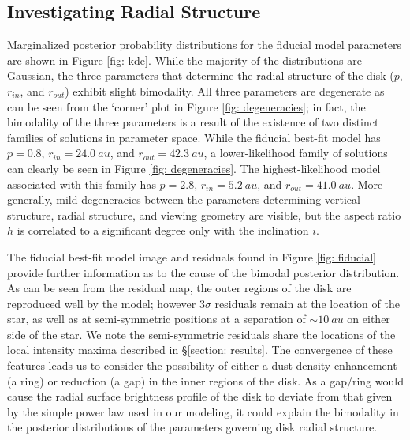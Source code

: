 \documentclass[modern]{aastex62}
\begin{document}
\subsection{Investigating Radial Structure}
\label{subsection: radial analysis}

Marginalized posterior probability distributions for the fiducial model parameters are shown in Figure \ref{fig: kde}.
While the majority of the distributions are Gaussian, the three parameters that determine the radial structure of the disk ($p$, $r_{in}$, and $r_{out}$) exhibit slight bimodality. 
All three parameters are degenerate as can be seen from the `corner' plot in Figure \ref{fig: degeneracies}; in fact, the bimodality of the three parameters is a result of the existence of two distinct families of solutions in parameter space.
While the fiducial best-fit model has $p=0.8$, $r_{in}=\SI{24.0}{au}$, and $r_{out}=\SI{42.3}{au}$, a lower-likelihood family of solutions can clearly be seen in Figure \ref{fig: degeneracies}. The highest-likelihood model associated with this family has $p = 2.8$, $r_{in} = \SI{5.2}{au}$, and $r_{out} = \SI{41.0}{au}$.
More generally, mild degeneracies between the parameters determining vertical structure, radial  structure, and viewing geometry are visible, but the aspect ratio $h$ is correlated to a significant degree only with the inclination $i$.

The fiducial best-fit model image and residuals found in Figure \ref{fig: fiducial} provide further information as to the cause of the bimodal posterior distribution.
As can be seen from the residual map, the outer regions of the disk are reproduced well by the model; however $3\sigma$ residuals remain at the location of the star, as well as at semi-symmetric positions at a separation of $\sim \SI{10}{au}$ on either side of the star. 
We note the semi-symmetric residuals share the locations of the local intensity maxima described in \S \ref{section: results}. 
The convergence of these features leads us to consider the possibility of either a dust density enhancement (a ring) or reduction (a gap) in the inner regions of the disk. 
As a gap/ring would cause the radial surface brightness profile of the disk to deviate from that given by the simple power law used in our modeling, it could explain the bimodality in the posterior distributions of the parameters governing disk radial structure.
\end{document}
